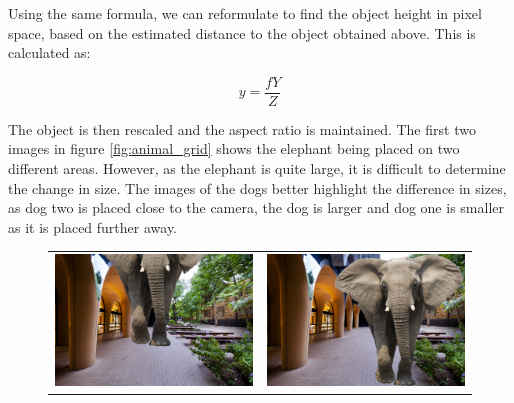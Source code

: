 \documentclass{article}
\begin{document}
Using the same formula, we can reformulate to find the object height in pixel space, based on the estimated distance to the object obtained above. This is calculated as:

\[
y = \frac{fY}{Z}
\]

The object is then rescaled and the aspect ratio is maintained. The first two images in figure \ref{fig:animal_grid} shows the elephant being placed on two different areas. However, as the elephant is quite large, it is difficult to determine the change in size. The images of the dogs better highlight the difference in sizes, as dog two is placed close to the camera, the dog is larger and dog one is smaller as it is placed further away.


\begin{figure}[h!]
    \centering
    \begin{tabular}{cc}
        \includegraphics[scale=0.08]{images/elephant(1500x1400).jpg} & \includegraphics[scale=0.08]{images/elephant(2000x2000).jpg} \\

\end{tabular}
\end{figure}
\end{document}
